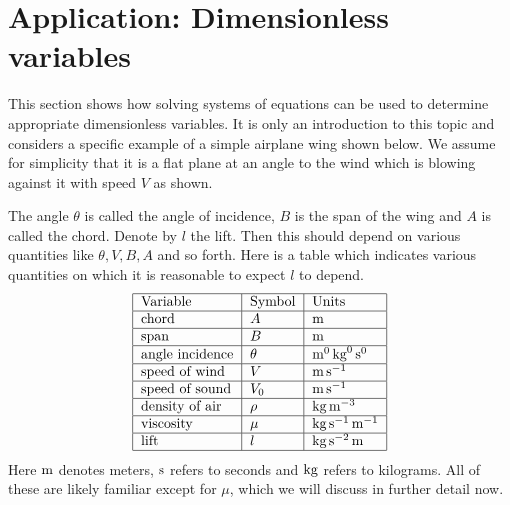 \section{Application: Dimensionless variables}

This section shows how solving systems of equations can be used to
determine appropriate dimensionless variables. It is only an
introduction to this topic and considers a specific example of a
simple airplane wing shown below. We assume for simplicity that it is a flat plane at an angle to the wind which is blowing against it
with speed $V$ as shown.

\begin{center}
\end{center}

The angle $\theta$ is called the angle of incidence, $B$ is the span of the wing and $A$ is called the chord. Denote by $l$ the lift. Then this should depend on
various quantities like $\theta ,V,B,A$ and so forth. Here is a table which
indicates various quantities on which it is reasonable to expect $l$ to
depend.
\begin{equation*}
\begin{tabular}{|l|l|l|}
\hline
Variable & Symbol & Units \\ \hline
chord & $A$ & $\m$ \\ \hline
span & $B$ & $\m$ \\ \hline
angle incidence & $\theta $ & $\m^{0}\kg^{0}\s ^{0}$ \\ \hline
speed of wind & $V$ & $\m\s ^{-1}$ \\ \hline
speed of sound & $V_{0}$ & $\m\s ^{-1}$ \\ \hline
density of air & $\rho $ & $\kg\m^{-3}$ \\ \hline
viscosity & $\mu $ & $\kg\s ^{-1}\m^{-1}$ \\ \hline
lift & $l$ & $\kg\s ^{-2}\m$ \\ \hline
\end{tabular}
\end{equation*}
Here $\mathop{\textrm{\rm m}}\nolimits$ denotes meters, $\mathop{\textrm{\rm s}}\nolimits $ refers to seconds and $\mathop{\textrm{\rm kg}}\nolimits$ refers to
kilograms. All of these are likely familiar except for $\mu$, which we will discuss in further detail now.

